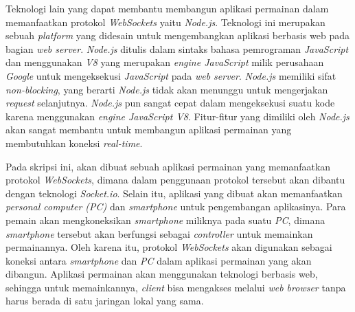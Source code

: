 Teknologi lain yang dapat membantu membangun aplikasi permainan dalam memanfaatkan protokol \textit{WebSockets} yaitu \textit{Node.js}. Teknologi ini merupakan sebuah \textit{platform} yang didesain untuk mengembangkan aplikasi berbasis web pada bagian \textit{web server}. \textit{Node.js} ditulis dalam sintaks bahasa pemrograman \textit{JavaScript} dan menggunakan \textit{V8} yang merupakan \textit{engine JavaScript} milik perusahaan \textit{Google} untuk mengeksekusi \textit{JavaScript} pada \textit{web server}. \textit{Node.js} memiliki sifat \textit{non-blocking}, yang berarti \textit{Node.js} tidak akan menunggu untuk mengerjakan \textit{request} selanjutnya. \textit{Node.js} pun sangat cepat dalam mengeksekusi suatu kode karena menggunakan \textit{engine JavaScript V8}. Fitur-fitur yang dimiliki oleh \textit{Node.js} akan sangat membantu untuk membangun aplikasi permainan yang membutuhkan koneksi \textit{real-time}.

Pada skripsi ini, akan dibuat sebuah aplikasi permainan yang memanfaatkan protokol \textit{WebSockets}, dimana dalam penggunaan protokol tersebut akan dibantu dengan teknologi \textit{Socket.io}. Selain itu, aplikasi yang dibuat akan memanfaatkan \textit{personal computer (PC)} dan \textit{smartphone} untuk pengembangan aplikasinya. Para pemain akan mengkoneksikan \textit{smartphone} miliknya pada suatu \textit{PC}, dimana \textit{smartphone} tersebut akan berfungsi sebagai \textit{controller} untuk memainkan permainannya. Oleh karena itu, protokol \textit{WebSockets} akan digunakan sebagai koneksi antara \textit{smartphone} dan \textit{PC} dalam aplikasi permainan yang akan dibangun. Aplikasi permainan akan menggunakan teknologi berbasis web, sehingga untuk memainkannya, \textit{client} bisa mengakses melalui \textit{web browser} tanpa harus berada di satu jaringan lokal yang sama.



